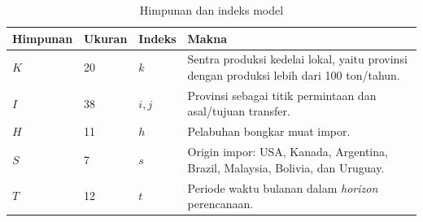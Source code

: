 \documentclass{file/TA-ITS}
\theoremstyle{definition}
\theoremstyle{definition}
\theoremstyle{plain}
\begin{document}
\begin{table}[H]
\centering
\caption{Himpunan dan indeks model}
\label{tab:model_sets}
\footnotesize
\renewcommand{\arraystretch}{1.08}
\begin{tabularx}{\textwidth}{@{}p{}p{}p{}X@{}}
\toprule
\textbf{Himpunan} & \textbf{Ukuran} & \textbf{Indeks} & \textbf{Makna} \\
\midrule
$K$ & 20 & $k$ & Sentra produksi kedelai lokal, yaitu provinsi dengan produksi lebih dari 100 ton/tahun. \\
$I$ & 38 & $i,j$ & Provinsi sebagai titik permintaan dan asal/tujuan transfer. \\
$H$ & 11 & $h$ & Pelabuhan bongkar muat impor. \\
$S$ & 7 & $s$ & Origin impor: USA, Kanada, Argentina, Brazil, Malaysia, Bolivia, dan Uruguay. \\
$T$ & 12 & $t$ & Periode waktu bulanan dalam \textit{horizon} perencanaan. \\
\bottomrule
\end{tabularx}
\renewcommand{\arraystretch}{1}
\end{table}
\end{document}
